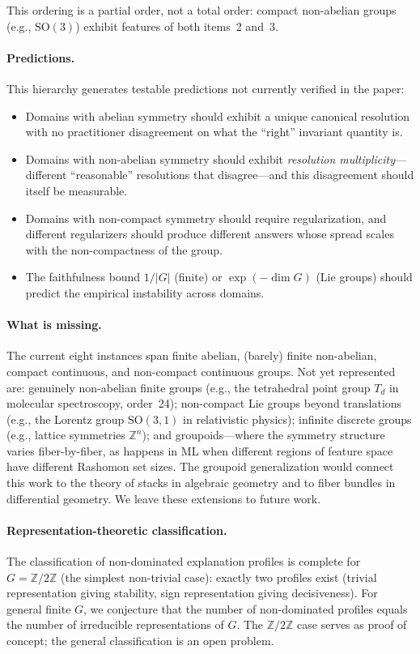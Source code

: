 \documentclass[11pt,a4paper]{article}
\begin{document}
\noindent This ordering is a partial order, not a total order: compact non-abelian groups (e.g., $\mathrm{SO}(3)$) exhibit features of both items~2 and~3.

\paragraph{Predictions.}
This hierarchy generates testable predictions not currently verified in the
paper:
\begin{itemize}
  \item Domains with abelian symmetry should exhibit a unique canonical
    resolution with no practitioner disagreement on what the ``right''
    invariant quantity is.
  \item Domains with non-abelian symmetry should exhibit \emph{resolution
    multiplicity}---different ``reasonable'' resolutions that disagree---and
    this disagreement should itself be measurable.
  \item Domains with non-compact symmetry should require regularization,
    and different regularizers should produce different answers whose spread
    scales with the non-compactness of the group.
  \item The faithfulness bound $1/|G|$ (finite) or $\exp(-\dim G)$
    (Lie groups) should predict the empirical instability across domains.
\end{itemize}

\paragraph{What is missing.}
The current eight instances span finite abelian, (barely) finite non-abelian,
compact continuous, and non-compact continuous groups.  Not yet represented
are: genuinely non-abelian finite groups (e.g., the tetrahedral point group
$T_d$ in molecular spectroscopy, order~24); non-compact Lie groups beyond
translations (e.g., the Lorentz group $\mathrm{SO}(3,1)$ in relativistic
physics); infinite discrete groups (e.g., lattice symmetries
$\mathbb{Z}^n$); and groupoids---where the symmetry structure varies
fiber-by-fiber, as happens in ML when different regions of feature space have
different Rashomon set sizes.  The groupoid generalization would connect this
work to the theory of stacks in algebraic geometry and to fiber bundles in
differential geometry.  We leave these extensions to future work.

\paragraph{Representation-theoretic classification.}
The classification of non-dominated explanation profiles is complete for $G = \mathbb{Z}/2\mathbb{Z}$ (the simplest non-trivial case): exactly two profiles exist (trivial representation giving stability, sign representation giving decisiveness). For general finite $G$, we conjecture that the number of non-dominated profiles equals the number of irreducible representations of $G$. The $\mathbb{Z}/2\mathbb{Z}$ case serves as proof of concept; the general classification is an open problem.
\end{document}
